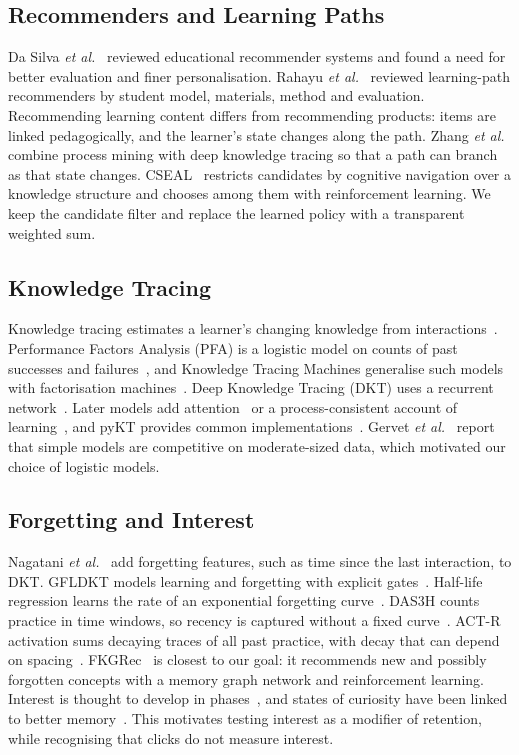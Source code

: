 \documentclass[conference]{IEEEtran}
\begin{document}
\subsection{Recommenders and Learning Paths}
Da Silva \emph{et al.}~\cite{dasilva2023} reviewed educational recommender systems and found a need for better evaluation and finer personalisation. Rahayu \emph{et al.}~\cite{rahayu2023} reviewed learning-path recommenders by student model, materials, method and evaluation. Recommending learning content differs from recommending products: items are linked pedagogically, and the learner's state changes along the path. Zhang \emph{et al.}~\cite{zhang} combine process mining with deep knowledge tracing so that a path can branch as that state changes. CSEAL~\cite{liu2019} restricts candidates by cognitive navigation over a knowledge structure and chooses among them with reinforcement learning. We keep the candidate filter and replace the learned policy with a transparent weighted sum.

\subsection{Knowledge Tracing}
Knowledge tracing estimates a learner's changing knowledge from interactions~\cite{abdelrahman2023}. Performance Factors Analysis (PFA) is a logistic model on counts of past successes and failures~\cite{pavlik2009}, and Knowledge Tracing Machines generalise such models with factorisation machines~\cite{vie2019}. Deep Knowledge Tracing (DKT) uses a recurrent network~\cite{piech2015}. Later models add attention~\cite{ghosh2020} or a process-consistent account of learning~\cite{shen2021}, and pyKT provides common implementations~\cite{liu2022}. Gervet \emph{et al.}~\cite{gervet2020} report that simple models are competitive on moderate-sized data, which motivated our choice of logistic models.

\subsection{Forgetting and Interest}
Nagatani \emph{et al.}~\cite{nagatani2019} add forgetting features, such as time since the last interaction, to DKT. GFLDKT models learning and forgetting with explicit gates~\cite{zhao2023}. Half-life regression learns the rate of an exponential forgetting curve~\cite{settles2016}. DAS3H counts practice in time windows, so recency is captured without a fixed curve~\cite{choffin2019}. ACT-R activation sums decaying traces of all past practice, with decay that can depend on spacing~\cite{pavlik2005}. FKGRec~\cite{fan2026} is closest to our goal: it recommends new and possibly forgotten concepts with a memory graph network and reinforcement learning. Interest is thought to develop in phases~\cite{hidi2006}, and states of curiosity have been linked to better memory~\cite{gruber2014}. This motivates testing interest as a modifier of retention, while recognising that clicks do not measure interest.
\end{document}
